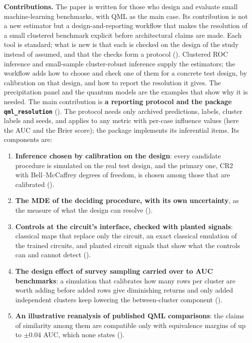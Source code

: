 \documentclass[11pt,a4paper]{article}
\begin{document}
\textbf{Contributions.} The paper is written for those who design and evaluate small machine-learning benchmarks, with QML as the main case. Its contribution is not a new estimator but a design-and-reporting workflow that makes the resolution of a small clustered benchmark explicit before architectural claims are made. Each tool is standard; what is new is that each is checked on the design of the study instead of assumed, and that the checks form a protocol (). Clustered ROC inference \citep{obuchowski1997} and small-sample cluster-robust inference \citep{mackinnon2023,pustejovsky2018} supply the estimators; the workflow adds how to choose and check one of them for a concrete test design, by calibration on that design, and how to report the resolution it gives. The precipitation panel and the quantum models are the examples that show why it is needed.
The main contribution is \textbf{a reporting protocol and the package \texttt{qml\_resolution}} (). The protocol needs only archived predictions, labels, cluster labels and seeds, and applies to any metric with per-case influence values (here the AUC and the Brier score); the package implements its inferential items. Its components are:
\begin{enumerate}
        \item \textbf{Inference chosen by calibration on the design}: every candidate procedure is simulated on the real test design, and the primary one, CR2 with Bell--McCaffrey degrees of freedom, is chosen among those that are calibrated ().
        \item \textbf{The MDE of the deciding procedure, with its own uncertainty}, as the measure of what the design can resolve ().
        \item \textbf{Controls at the circuit's interface, checked with planted signals}: classical maps that replace only the circuit, an exact classical emulation of the trained circuits, and planted circuit signals that show what the controls can and cannot detect ().
        \item \textbf{The design effect of survey sampling \citep{kish1965} carried over to AUC benchmarks}: a simulation that calibrates how many rows per cluster are worth adding before added rows give diminishing returns and only added independent clusters keep lowering the between-cluster component ().
        \item \textbf{An illustrative reanalysis of published QML comparisons}: the claims of similarity among them are compatible only with equivalence margins of up to $\pm0.04$ AUC, which none states ().
\end{enumerate}
\end{document}
